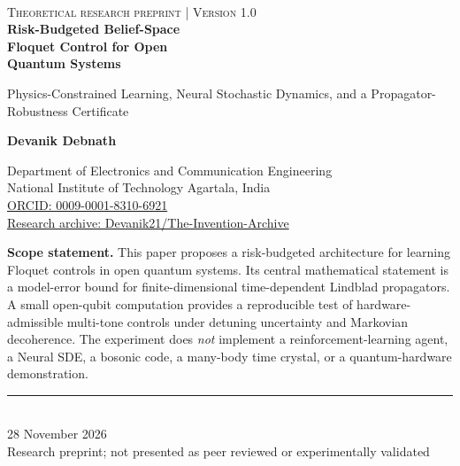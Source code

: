 \documentclass[10pt,twoside]{article}
\begin{document}
\begin{titlepage}
\thispagestyle{empty}
\vspace*{9mm}
\noindent{\color{teal}\rule{\textwidth}{1.3pt}}\\[7mm]
{\large\color{muted}\textsc{Theoretical research preprint \quad | \quad Version 1.0}}\\[15mm]
{\Huge\bfseries\color{ink} Risk-Budgeted Belief-Space\\Floquet Control for Open\\Quantum Systems}\par
\vspace{5mm}
{\LARGE\color{teal} Physics-Constrained Learning, Neural Stochastic Dynamics, and a Propagator-Robustness Certificate}\par
\vspace{13mm}
{\large\bfseries Devanik Debnath}\par
Department of Electronics and Communication Engineering\\
National Institute of Technology Agartala, India\\
\href{https://orcid.org/0009-0001-8310-6921}{ORCID: 0009-0001-8310-6921}\\
\href{https://github.com/Devanik21/The-Invention-Archive}{Research archive: Devanik21/The-Invention-Archive}
\vfill
\begin{minipage}{0.91\textwidth}
\small
\textbf{Scope statement.} This paper proposes a risk-budgeted architecture for learning Floquet controls in open quantum systems. Its central mathematical statement is a model-error bound for finite-dimensional time-dependent Lindblad propagators. A small open-qubit computation provides a reproducible test of hardware-admissible multi-tone controls under detuning uncertainty and Markovian decoherence. The experiment does \emph{not} implement a reinforcement-learning agent, a Neural SDE, a bosonic code, a many-body time crystal, or a quantum-hardware demonstration.
\end{minipage}
\vspace{8mm}
\begin{center}
\textcolor{teal}{\rule{0.91\textwidth}{0.6pt}}\\[4mm]
{\large 28 November 2026}\\
{\small Research preprint; not presented as peer reviewed or experimentally validated}
\end{center}
\end{titlepage}
\end{document}
